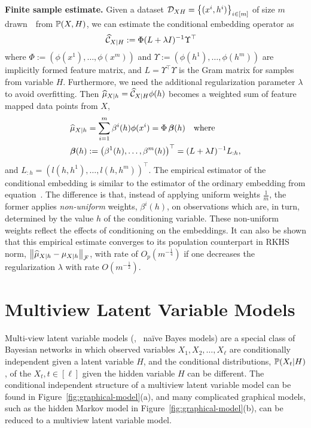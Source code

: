 \documentclass[11pt]{article}
\newcommand{\hmu}{\widehat{\mu}}
\begin{document}
{\bf Finite sample estimate.} Given a dataset $\mathcal{D}_{XH}=\left\{(x^i,h^i)\right\}_{i\in[m]}$ of size $m$ drawn~\iid~from $\mathbb{P}(X,H)$, we can estimate the conditional embedding operator as
\begin{align}
    & \widehat{\mathcal{C}}_{X|H} := \Phi (L + \lambda I)^{-1} \Upsilon^\top  \label{eq:embeddingoperatorestimator}
\end{align}
where $\Phi:=(\phi(x^1),\ldots,\phi(x^m))$ and $\Upsilon:=(\phi(h^1),\ldots,\phi(h^m))$ are implicitly formed feature matrix, and $L=\Upsilon^\top \Upsilon$ is the Gram matrix for samples from variable $H$. Furthermore, we need the additional regularization parameter $\lambda$ to avoid overfitting. Then $\hmu_{X|h}=\widehat{\Ccal}_{X|H}\phi(h)$ becomes a weighted sum of feature mapped data points from $X$,
\begin{align}
    & \hmu_{X|h} = \sum_{i=1}^m \beta^i(h) \phi(x^i) = \Phi\, \betab(h) \quad \text{where} \,  \label{eq:conditionalembeddingestimator}\\
    & \betab(h) := \rbr{\beta^1(h), \ldots, \beta^m(h)}^\top = (L + \lambda I)^{-1} L_{: h}, \nonumber
\end{align}
and $L_{: h}=(l(h,h^1),\ldots,l(h,h^m))^\top$.
The empirical estimator of the conditional embedding
is similar to the estimator of the ordinary embedding from
equation~. The difference
is that, instead of applying uniform weights $\frac{1}{m}$,
the former applies {\em non-uniform} weights, $\beta^i(h)$, on
observations which are, in turn, determined by the value $h$ of the conditioning
variable. These non-uniform weights reflect the effects of
conditioning on the embeddings. It can also be shown that this empirical estimate converges to its population counterpart in RKHS norm, $\nbr{\hmu_{X|h} - \mu_{X|h}}_{\Fcal}$, with rate of $O_p(m^{-\frac{1}{4}})$ if one decreases the regularization $\lambda$ with rate $O(m^{-\frac{1}{2}})$.

\section{Multiview Latent Variable Models}

Multi-view latent variable models (\eg, \, na\"ive Bayes models) are a
special class of Bayesian networks in which observed variables $X_1, X_2,
\ldots, X_\ell$ are conditionally independent given a latent variable $H$, and
the conditional distributions, $\mathbb{P}(X_t|H)$, of the $X_t, t \in [\ell]$ given the hidden variable $H$ can be different. The conditional independent structure of a multiview latent variable model can be found in Figure~\ref{fig:graphical-model}(a), and many complicated graphical models, such as the hidden Markov model in Figure~\ref{fig:graphical-model}(b), can be reduced to a multiview latent variable model. 
\end{document}
